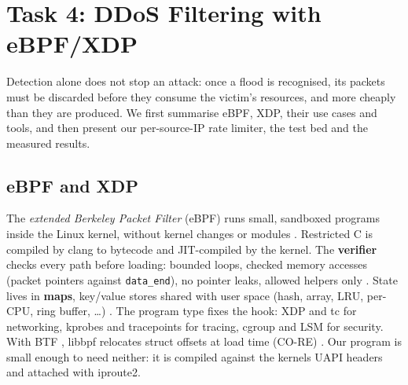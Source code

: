 \chapter{Task 4: DDoS Filtering with eBPF/XDP}\label{ch:task4}

Detection alone does not stop an attack: once a flood is recognised, its packets must be discarded before they consume the victim's resources, and more cheaply than they are produced. We first summarise eBPF, XDP, their use cases and tools, and then present our per-source-IP rate limiter, the test bed and the measured results.

\section{eBPF and XDP}\label{sec:t4-ebpf}\label{sec:t4-xdp}
The \emph{extended Berkeley Packet Filter} (eBPF) runs small, sandboxed programs inside the Linux kernel, without kernel changes or modules \autocite{kdoc_bpf,ebpf_what}. Restricted C is compiled by clang to bytecode and JIT-compiled by the kernel. The \textbf{verifier} checks every path before loading: bounded loops, checked memory accesses (packet pointers against \texttt{data\_end}), no pointer leaks, allowed helpers only \autocite{kdoc_verifier}. State lives in \textbf{maps}, key/value stores shared with user space (hash, array, LRU, per-CPU, ring buffer, \dots) \autocite{kdoc_maps,kdoc_maphash}. The program type fixes the hook: XDP and tc for networking, kprobes and tracepoints for tracing, cgroup and LSM for security. With BTF \autocite{kdoc_btf}, libbpf relocates struct offsets at load time (CO-RE) \autocite{nakryiko_core}. Our program is small enough to need neither: it is compiled against the kernel\textquotesingle s UAPI headers and attached with iproute2.

